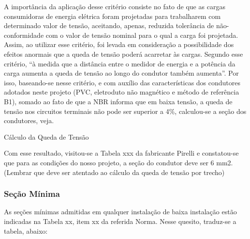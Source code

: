 A importância da aplicação desse critério consiste no fato de que as cargas consumidoras de energia elétrica foram projetadas para trabalharem com determinado valor de tensão, aceitando, apenas, reduzida tolerância de não-conformidade com o valor de tensão nominal para o qual a carga foi projetada.
Assim, ao utilizar esse critério, foi levada em consideração a possibilidade dos efeitos anormais que a queda de tensão poderá acarretar às cargas.
 Segundo esse critério, “à medida que a distância entre o medidor de energia e a potência da carga aumenta a queda de tensão ao longo do condutor também aumenta”. 
Por isso, baseando-se nesse critério, e com auxílio das características dos condutores adotados neste projeto (PVC, eletroduto não magnético e método de referência B1), somado ao fato de que a NBR informa que em baixa tensão, a queda de tensão nos circuitos terminais não pode ser superior a 4\%, calculou-se a seção dos condutores, veja.

\begin{description}

	\item Cálculo da Queda de Tensão
	
	Com esse resultado, visitou-se a Tabela xxx da fabricante Pirelli e constatou-se que para as condições do nosso projeto, a seção do condutor deve ser 6 mm2.
(Lembrar que deve ser atentado ao cálculo da queda de tensão por trecho)
	
\end{description}

\subsubsection{Seção Mínima}

As seções mínimas admitidas em qualquer instalação de baixa instalação estão indicadas na Tabela xx, item xx da referida Norma. Nesse quesito, traduz-se a tabela, abaixo:


